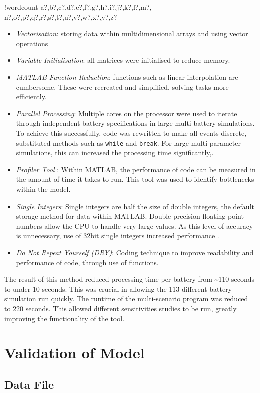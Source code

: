 \documentclass[fontsize=9.5pt]{extarticle}
\numberwithin{figure}{section} %
\providecommand{\tightlist}{%
  \setlength{\itemsep}{0pt}\setlength{\parskip}{0pt}}
\newcounter{words}
\newenvironment{counted}{%
  \setcounter{words}{0}
  \SearchList!{wordcount}{\stepcounter{words}}
    {a?,b?,c?,d?,e?,f?,g?,h?,i?,j?,k?,l?,m?,
    n?,o?,p?,q?,r?,s?,t?,u?,v?,w?,x?,y?,z?}
  \UndoBoundary{'}
  \SearchOrder{p;}}{%
  \StopSearching}
\begin{document}
\begin{counted}
\begin{itemize}
\tightlist
\item
  \emph{Vectorisation}: storing data within multidimensional arrays and
  using vector operations
\item
  \emph{Variable Initialisation}: all matrices were initialised to
  reduce memory.
\item
  \emph{MATLAB Function Reduction}: functions such as linear
  interpolation are cumbersome. These were recreated and simplified,
  solving tasks more efficiently.
\item
  \emph{Parallel Processing}: Multiple cores on the processor were used
  to iterate through independent battery specifications in large
  multi-battery simulations. To achieve this successfully, code was
  rewritten to make all events discrete, substituted methods such as
  \texttt{while} and \texttt{break}. For large multi-parameter
  simulations, this can increased the processing time significantly,.
\item
  \emph{Profiler Tool }: Within MATLAB, the performance of code can be
  measured in the amount of time it takes to run. This tool was used to
  identify bottlenecks within the model.
\item
  \emph{Single Integers}: Single integers are half the size of double
  integers, the default storage method for data within MATLAB.
  Double-precision floating point numbers allow the CPU to handle very
  large values. As this level of accuracy is unnecessary, use of 32bit
  single integers increased performance \autocite{getreuer5685writing}.
\item
  \emph{Do Not Repeat Yourself (DRY)}: Coding technique to improve
  readability and performance of code, through use of functions.
\end{itemize}

The result of this method reduced processing time per battery from
\textasciitilde{}110 seconds to under 10 seconds. This was crucial in
allowing the 113 different battery simulation run quickly. The runtime
of the multi-scenario program was reduced to 220 seconds. This allowed
different sensitivities studies to be run, greatly improving the
functionality of the tool.

\section{Validation of Model}\label{validation-of-model}

\subsection{Data File}\label{data-file}


\end{counted}
\end{document}
